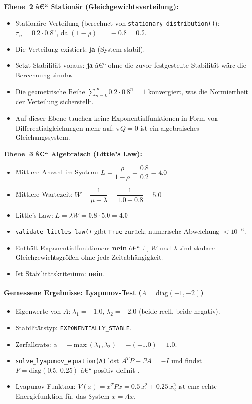 ﻿\documentclass[a4paper,12pt]{scrreprt}
\theoremstyle{definition}
\begin{document}
\textbf{Ebene~2 â€“ Stationär (Gleichgewichtsverteilung):}
\begin{itemize}
	\item Stationäre Verteilung (berechnet von
	\texttt{stationary\_distribution()}):
	$\pi_n = 0.2 \cdot 0.8^n$, da $(1-\rho) = 1 - 0.8 = 0.2$.
	\item Die Verteilung existiert: \textbf{ja} (System stabil).
	\item Setzt Stabilität voraus: \textbf{ja} â€“ ohne die zuvor
	festgestellte Stabilität wäre die Berechnung sinnlos.
	\item Die geometrische Reihe $\sum_{n=0}^\infty 0.2 \cdot 0.8^n = 1$
	konvergiert, was die Normiertheit der Verteilung sicherstellt.
	\item Auf dieser Ebene tauchen keine Exponentialfunktionen in Form
	von Differentialgleichungen mehr auf: $\pi Q = 0$ ist ein
	algebraisches Gleichungssystem.
\end{itemize}

\textbf{Ebene~3 â€“ Algebraisch (Little's Law):}
\begin{itemize}
	\item Mittlere Anzahl im System:
	$L = \dfrac{\rho}{1-\rho} = \dfrac{0.8}{0.2} = 4.0$
	\item Mittlere Wartezeit:
	$W = \dfrac{1}{\mu - \lambda} = \dfrac{1}{1.0 - 0.8} = 5.0$
	\item Little's Law:
	$L = \lambda W = 0.8 \cdot 5.0 = 4.0$ \checkmark
	\item \texttt{validate\_littles\_law()} gibt \texttt{True} zurück;
	numerische Abweichung $< 10^{-6}$.
	\item Enthält Exponentialfunktionen: \textbf{nein} â€“ $L$, $W$ und
	$\lambda$ sind skalare Gleichgewichtsgrößen ohne jede
	Zeitabhängigkeit.
	\item Ist Stabilitätskriterium: \textbf{nein}.
\end{itemize}

\paragraph{Gemessene Ergebnisse: Lyapunov-Test ($A = \text{diag}(-1,-2)$)}

\begin{itemize}
	\item Eigenwerte von $A$: $\lambda_1 = -1.0$, $\lambda_2 = -2.0$
	(beide reell, beide negativ).
	\item Stabilitätstyp: \texttt{EXPONENTIALLY\_STABLE}.
	\item Zerfallsrate: $\alpha = -\max(\lambda_1, \lambda_2) =
	-(-1.0) = 1.0$.
	\item \texttt{solve\_lyapunov\_equation(A)} löst $A^T P + PA = -I$
	und findet
	$P = \text{diag}(0.5,\, 0.25)$ â€“ positiv definit \checkmark.
	\item Lyapunov-Funktion: $V(x) = x^T P x = 0.5\,x_1^2 + 0.25\,x_2^2$
	ist eine echte Energiefunktion für das System $\dot{x} = Ax$.
\end{itemize}
\end{document}
